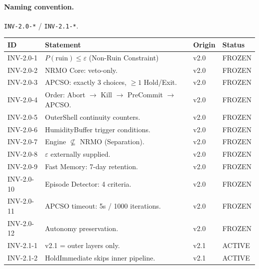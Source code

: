 \paragraph{Naming convention.}
\texttt{INV-2.0-*} / \texttt{INV-2.1-*}.

\begin{table}[ht]
\centering
\scriptsize
\begin{tabularx}{\linewidth}{lXll}
\toprule
\textbf{ID} & \textbf{Statement} & \textbf{Origin} & \textbf{Status} \\
\midrule

INV-2.0-1  & $P(\mathrm{ruin}) \le \varepsilon$ (Non-Ruin
Constraint) & v2.0 & FROZEN \\

INV-2.0-2  & NRMO Core: veto-only. & v2.0 & FROZEN \\

INV-2.0-3  & APCSO: exactly 3 choices, $\ge 1$ Hold/Exit. & v2.0
& FROZEN \\

INV-2.0-4  & Order: Abort $\to$ Kill $\to$ PreCommit $\to$ APCSO.
& v2.0 & FROZEN \\

INV-2.0-5  & OuterShell continuity counters. & v2.0 & FROZEN \\

INV-2.0-6  & HumidityBuffer trigger conditions. & v2.0 & FROZEN \\

INV-2.0-7  & Engine $\not\subseteq$ NRMO (Separation). & v2.0
& FROZEN \\

INV-2.0-8  & $\varepsilon$ externally supplied. & v2.0 & FROZEN \\

INV-2.0-9  & Fast Memory: 7-day retention. & v2.0 & FROZEN \\

INV-2.0-10 & Episode Detector: 4 criteria. & v2.0 & FROZEN \\

INV-2.0-11 & APCSO timeout: 5s / 1000 iterations. & v2.0 & FROZEN \\

INV-2.0-12 & Autonomy preservation. & v2.0 & FROZEN \\

INV-2.1-1  & v2.1 = outer layers only. & v2.1 & ACTIVE \\

INV-2.1-2  & HoldImmediate skips inner pipeline. & v2.1 & ACTIVE \\


\end{tabularx}
\end{table}
